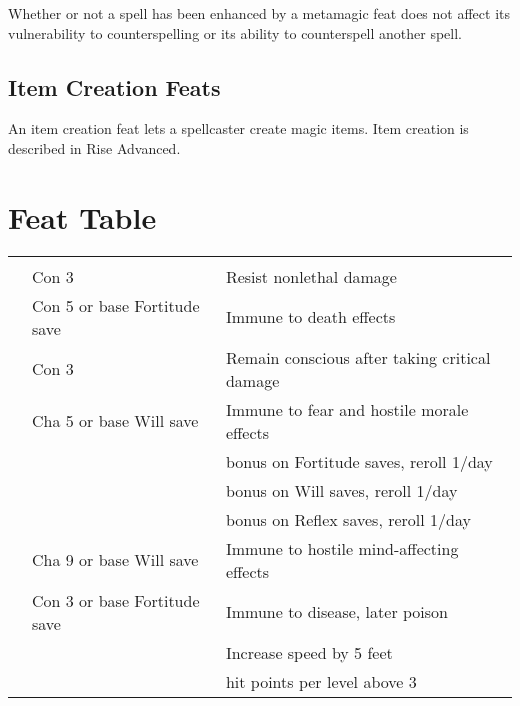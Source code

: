  Whether or not a spell has been enhanced by a metamagic feat does not affect its vulnerability to counterspelling or its ability to counterspell another spell.

\subsection{Item Creation Feats}
An item creation feat lets a spellcaster create magic items. Item creation is described in Rise Advanced.

\onecolumn
\section{Feat Table}

{\small
{}
\begin{longtabu}{>{\lcol}p{15em} >{\lcol}p{15em} >{\lcol}X}
 &  &  \\
 & Con 3 & Resist nonlethal damage \\
 & Con 5 or base Fortitude save  & Immune to death effects \\
 & Con 3 & Remain conscious after taking critical damage \\
 & Cha 5 or base Will save  & Immune to fear and hostile morale effects \\
 & \x &   bonus on Fortitude saves, reroll 1/day \\
 & \x &   bonus on Will saves, reroll 1/day \\
 & \x &   bonus on Reflex saves, reroll 1/day \\
 & Cha 9 or base Will save  & Immune to hostile mind-affecting effects \\
 & Con 3 or base Fortitude save  & Immune to disease, later poison \\
 & \x & Increase speed by 5 feet \\
 & \x &   hit points  per level above 3 \\


\end{longtabu}}
